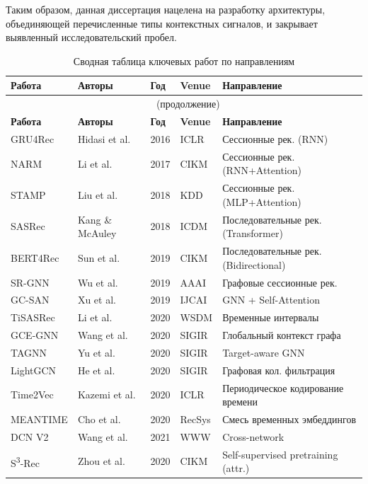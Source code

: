 Таким образом, данная диссертация нацелена на разработку архитектуры, объединяющей перечисленные типы контекстных сигналов, и закрывает выявленный исследовательский пробел.

\begin{longtable}{p{3.5cm} p{3cm} p{1cm} p{2cm} p{4cm}}
    \caption{Сводная таблица ключевых работ по направлениям}
    \label{tab:ch1:papers} \\
    \toprule
    \textbf{Работа} & \textbf{Авторы} & \textbf{Год} & \textbf{Venue} & \textbf{Направление} \\
    \midrule
    \endfirsthead
    \multicolumn{5}{c}{\tablename\ \thetable{} (продолжение)} \\
    \toprule
    \textbf{Работа} & \textbf{Авторы} & \textbf{Год} & \textbf{Venue} & \textbf{Направление} \\
    \midrule
    \endhead
    \bottomrule
    \endfoot
    GRU4Rec & Hidasi et al. & 2016 & ICLR & Сессионные рек. (RNN) \\
    NARM & Li et al. & 2017 & CIKM & Сессионные рек. (RNN+Attention) \\
    STAMP & Liu et al. & 2018 & KDD & Сессионные рек. (MLP+Attention) \\
    SASRec & Kang \& McAuley & 2018 & ICDM & Последовательные рек. (Transformer) \\
    BERT4Rec & Sun et al. & 2019 & CIKM & Последовательные рек. (Bidirectional) \\
    SR-GNN & Wu et al. & 2019 & AAAI & Графовые сессионные рек. \\
    GC-SAN & Xu et al. & 2019 & IJCAI & GNN + Self-Attention \\
    TiSASRec & Li et al. & 2020 & WSDM & Временные интервалы \\
    GCE-GNN & Wang et al. & 2020 & SIGIR & Глобальный контекст графа \\
    TAGNN & Yu et al. & 2020 & SIGIR & Target-aware GNN \\
    LightGCN & He et al. & 2020 & SIGIR & Графовая кол. фильтрация \\
    Time2Vec & Kazemi et al. & 2020 & ICLR & Периодическое кодирование времени \\
    MEANTIME & Cho et al. & 2020 & RecSys & Смесь временных эмбеддингов \\
    DCN V2 & Wang et al. & 2021 & WWW & Cross-network \\
    S\textsuperscript{3}-Rec & Zhou et al. & 2020 & CIKM & Self-supervised pretraining (attr.) \\

\end{longtable}
